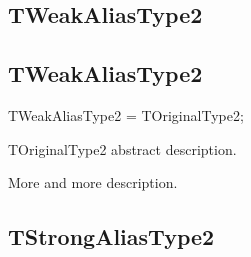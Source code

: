 \documentclass{report}
\newif\ifpdf
\begin{document}
\subsection*{\large{\textbf{TWeakAliasType2}}\normalsize\hspace{1ex}\hrulefill}
\else
\subsection*{TWeakAliasType2}
\fi
\label{ok_type_aliases-TWeakAliasType2}
\begin{list}{}{
\setlength{\itemindent}{0cm}
\setlength{\listparindent}{0cm}
\setlength{\leftmargin}{\evensidemargin}
\addtolength{\leftmargin}{\tmplength}
\settowidth{\labelsep}{X}
\addtolength{\leftmargin}{\labelsep}
\setlength{\labelwidth}{\tmplength}
}
\item[\textbf{Declaration}\hfill]
\ifpdf
\begin{flushleft}
\fi
\begin{ttfamily}
TWeakAliasType2 = TOriginalType2;\end{ttfamily}

\ifpdf
\end{flushleft}
\fi

\par
\item[\textbf{Description}]
TOriginalType2 abstract description.\hfill\vspace*{1ex}

 More and more description.

\end{list}
\ifpdf
\subsection*{\large{\textbf{TStrongAliasType2}}\normalsize\hspace{1ex}\hrulefill}
\else
\end{document}
